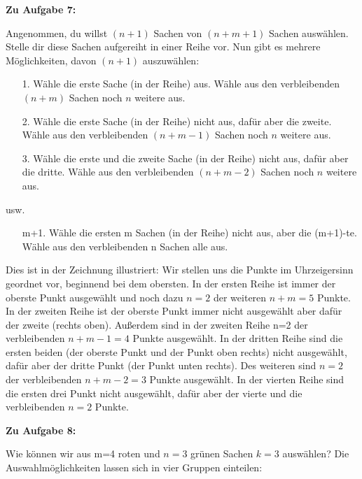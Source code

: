 \documentclass{article}
\begin{document}
\textbf{Zu Aufgabe 7:}

Angenommen, du willst $(n+1)$ Sachen von $(n+m+1)$ Sachen auswählen. Stelle dir diese Sachen aufgereiht in einer Reihe vor. Nun gibt es mehrere Möglichkeiten, davon $(n+1)$ auszuwählen:

\begin{enumerate}
  \item[1.] Wähle die erste Sache (in der Reihe) aus. Wähle aus den verbleibenden $(n+m)$ Sachen noch $n$ weitere aus.
  \item[2.] Wähle die erste Sache (in der Reihe) nicht aus, dafür aber die zweite. Wähle aus den verbleibenden $(n+m-1)$ Sachen noch $n$ weitere aus.
  \item[3.] Wähle die erste und die zweite Sache (in der Reihe) nicht aus, dafür aber die dritte. Wähle aus den verbleibenden $(n+m-2)$ Sachen noch $n$ weitere aus.
\end{enumerate}

usw.

\begin{enumerate}
  \item[m+1.] Wähle die ersten m Sachen (in der Reihe) nicht aus, aber die (m+1)-te. Wähle aus den verbleibenden n Sachen alle aus.
\end{enumerate}

Dies ist in der Zeichnung illustriert: Wir stellen uns die Punkte im Uhrzeigersinn geordnet vor, beginnend bei dem obersten.
In der ersten Reihe ist immer der oberste Punkt ausgewählt und noch dazu $n=2$ der weiteren $n+m=5$ Punkte. In der zweiten Reihe ist der oberste Punkt immer nicht ausgewählt aber dafür der zweite (rechts oben). Außerdem sind in der zweiten Reihe n=2 der verbleibenden $n+m-1=4$ Punkte ausgewählt.
In der dritten Reihe sind die ersten beiden (der oberste Punkt und der Punkt oben rechts) nicht ausgewählt, dafür aber der dritte Punkt (der Punkt unten rechts). Des weiteren sind $n=2$ der verbleibenden $n+m-2=3$ Punkte ausgewählt.
In der vierten Reihe sind die ersten drei Punkt nicht ausgewählt, dafür aber der vierte und die verbleibenden $n=2$ Punkte.


\textbf{Zu Aufgabe 8:}

Wie können wir aus m=4 roten und $n=3$ grünen Sachen $k=3$ auswählen?
Die Auswahlmöglichkeiten lassen sich in vier Gruppen einteilen:
\end{document}
